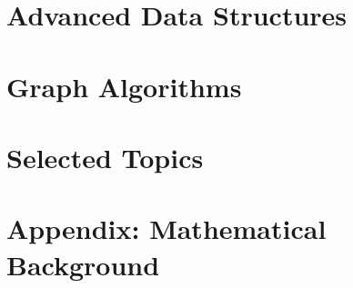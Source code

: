 \documentclass [11pt]{book}
\begin{document}

\part {Advanced Data Structures}


\part {Graph Algorithms}


\part {Selected Topics}


\part {Appendix: Mathematical Background}
\end{document}

